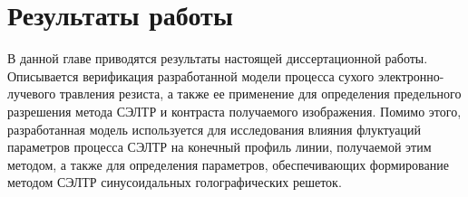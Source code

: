 \chapter{Результаты работы}

В данной главе приводятся результаты настоящей диссертационной работы. Описывается верификация разработанной модели процесса сухого электронно-лучевого травления резиста, а также ее применение для определения предельного разрешения метода СЭЛТР и контраста получаемого изображения. Помимо этого, разработанная модель используется для исследования влияния флуктуаций параметров процесса СЭЛТР на конечный профиль линии, получаемой этим методом, а также для определения параметров, обеспечивающих формирование методом СЭЛТР синусоидальных голографических решеток.








